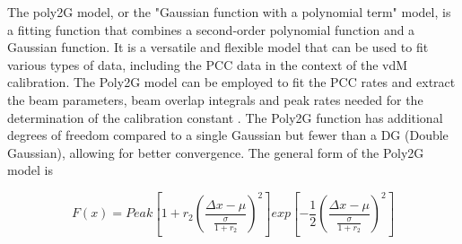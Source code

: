 The poly2G model, or the "Gaussian function with a polynomial term" model, is a fitting function that combines a second-order polynomial function and a Gaussian function. It is a versatile and flexible model that can be used to fit various types of data, including the PCC data in the context of the vdM calibration. %
The Poly2G model can be employed to fit the PCC rates %
and extract the beam parameters, beam overlap integrals and peak rates  needed for the determination of the calibration constant  %
\cite{Cekmecelioglu:2775639}. The Poly2G function has additional degrees of freedom compared to a single Gaussian but fewer than a DG (Double Gaussian), allowing for better convergence. The general form of the Poly2G model is



\begin{equation}
F(x) = Peak  \left [1+r_2 \left(\frac{\Delta x-\mu} {\frac{\sigma}{1+r_2}}\right)^2 \right] exp \left[-\frac{1}{2}\left(\frac{\Delta x-\mu}{\frac{\sigma}{1+r_2}}\right)^2\right]
\end{equation}

